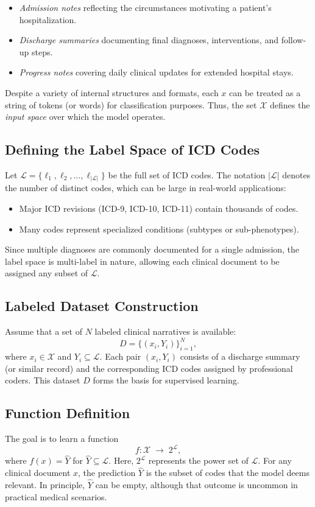 \begin{itemize}
    \item \emph{Admission notes} reflecting the circumstances motivating a patient's hospitalization.
    \item \emph{Discharge summaries} documenting final diagnoses, interventions, and follow-up steps.
    \item \emph{Progress notes} covering daily clinical updates for extended hospital stays.
\end{itemize}

Despite a variety of internal structures and formats, each \(x\) can be treated as a string of tokens (or words) for classification purposes. Thus, the set \(\mathcal{X}\) defines the \emph{input space} over which the model operates.

\subsection{Defining the Label Space of ICD Codes}
Let \(\mathcal{L} = \{\ell_1, \ell_2, \dots, \ell_{|\mathcal{L}|}\}\) be the full set of ICD codes. The notation \(|\mathcal{L}|\) denotes the number of distinct codes, which can be large in real-world applications:

\begin{itemize}
    \item Major ICD revisions (ICD-9, ICD-10, ICD-11) contain thousands of codes.
    \item Many codes represent specialized conditions (subtypes or sub-phenotypes).
\end{itemize}

Since multiple diagnoses are commonly documented for a single admission, the label space is multi-label in nature, allowing each clinical document to be assigned any subset of \(\mathcal{L}\).

\subsection{Labeled Dataset Construction}
Assume that a set of \(N\) labeled clinical narratives is available:
\[
D = \{ (x_i, Y_i)\}_{i=1}^N,
\]
where \(x_i \in \mathcal{X}\) and \(Y_i \subseteq \mathcal{L}\). Each pair \((x_i, Y_i)\) consists of a discharge summary (or similar record) and the corresponding ICD codes assigned by professional coders. This dataset \(D\) forms the basis for supervised learning.

\subsection{Function Definition}
The goal is to learn a function
\begin{equation}
f: \mathcal{X} \;\longrightarrow\; 2^{\mathcal{L}},
\label{eq:fundefinition}
\end{equation}
where \(f(x) = \hat{Y}\) for \(\hat{Y} \subseteq \mathcal{L}\). Here, \(2^{\mathcal{L}}\) represents the power set of \(\mathcal{L}\). For any clinical document \(x\), the prediction \(\hat{Y}\) is the subset of codes that the model deems relevant. In principle, \(\hat{Y}\) can be empty, although that outcome is uncommon in practical medical scenarios.

